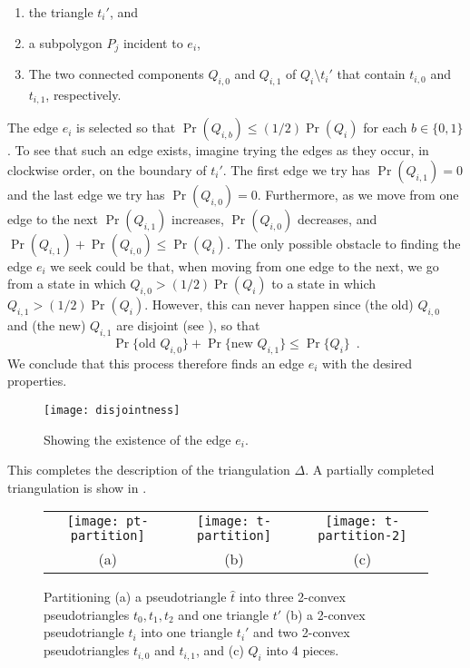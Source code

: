 \documentclass[acmtalg]{acmsmall}
\newcommand{\z}[1]{{\hat{#1}}}
\begin{document}
\begin{enumerate}
\item the triangle $t_i'$, and
\item a subpolygon $P_j$ incident to $e_i$,
\item The two connected components $Q_{i,0}$
and $Q_{i,1}$ of $Q_i\setminus t_i'$ that contain $t_{i,0}$ and
$t_{i,1}$, respectively.
\end{enumerate}
The edge $e_i$ is selected so that $\Pr(Q_{i,b})\le (1/2)\Pr(Q_i)$ for
each $b\in\{0,1\}$.  To see that such an edge exists, imagine trying
the edges as they occur, in clockwise order, on the boundary of $t_i'$.
The first edge we try has $\Pr(Q_{i,1}) = 0$ and the last edge we try has
$\Pr(Q_{i,0}) = 0$.  Furthermore, as we move from one edge to the next
$\Pr(Q_{i,1})$ increases, $\Pr(Q_{i,0})$ decreases, and $\Pr(Q_{i,1})
+ \Pr(Q_{i,0}) \le \Pr(Q_i)$.  The only possible obstacle to finding
the edge $e_i$ we seek could be that, when moving from one edge to the
next, we go from a state in which $Q_{i,0} > (1/2)\Pr(Q_i)$ to a state
in which $Q_{i,1} > (1/2)\Pr(Q_i)$. However, this can never happen since
(the old) $Q_{i,0}$ and (the new) $Q_{i,1}$ are disjoint (see ), so that
\[
   \Pr\{\mbox{old $Q_{i,0}$}\} + \Pr\{\mbox{new $Q_{i,1}$}\} \le \Pr\{Q_i\}
   \enspace .
\]
We conclude that this process therefore finds an edge $e_i$ with the desired
properties.

\begin{figure}
  \begin{center}
    \texttt{[image: disjointness]}
  \end{center}
  \caption{Showing the existence of the edge $e_i$.}
\end{figure}

This completes the description of the triangulation $\Delta$.  A partially
completed triangulation is show in .

\begin{figure}
  \begin{center}
    \begin{tabular}{ccc}
      \texttt{[image: pt-partition]} & 
      \texttt{[image: t-partition]} &
      \texttt{[image: t-partition-2]} \\
      (a) & (b) & (c)
    \end{tabular}
  \end{center}
  \caption{Partitioning (a) a pseudotriangle $\z t$ into three 2-convex
pseudotriangles $t_0,t_1,t_2$ and one triangle $t'$ (b) a 2-convex
pseudotriangle $t_i$ into one triangle $t_i'$ and two 2-convex
pseudotriangles $t_{i,0}$ and $t_{i,1}$, and (c) $Q_i$ into 4 pieces.}
\end{figure}
\end{document}

